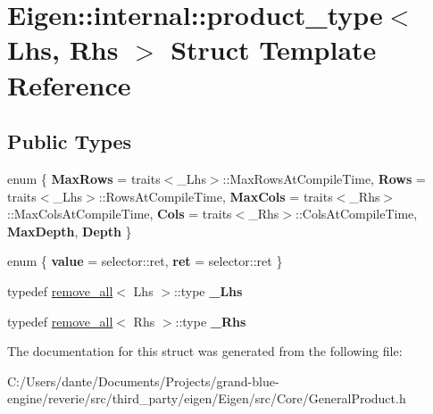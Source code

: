 \hypertarget{struct_eigen_1_1internal_1_1product__type}{}\section{Eigen\+::internal\+::product\+\_\+type$<$ Lhs, Rhs $>$ Struct Template Reference}
\label{struct_eigen_1_1internal_1_1product__type}
\subsection*{Public Types}
\begin{DoxyCompactItemize}
\item 
\mbox{\label{struct_eigen_1_1internal_1_1product__type_a43bedab2b6572dfa58b50adb88cfae9c}} 
enum \{ \newline
{\bfseries Max\+Rows} = traits$<$\+\_\+\+Lhs$>$\+::Max\+Rows\+At\+Compile\+Time, 
{\bfseries Rows} = traits$<$\+\_\+\+Lhs$>$\+::Rows\+At\+Compile\+Time, 
{\bfseries Max\+Cols} = traits$<$\+\_\+\+Rhs$>$\+::Max\+Cols\+At\+Compile\+Time, 
{\bfseries Cols} = traits$<$\+\_\+\+Rhs$>$\+::Cols\+At\+Compile\+Time, 
\newline
{\bfseries Max\+Depth}, 
{\bfseries Depth}
 \}
\item 
\mbox{\label{struct_eigen_1_1internal_1_1product__type_ab08e3c2381dfdaa6aff68d7395c0488f}} 
enum \{ {\bfseries value} = selector\+::ret, 
{\bfseries ret} = selector\+::ret
 \}
\item 
\mbox{\label{struct_eigen_1_1internal_1_1product__type_a7f952ac5559804440f762d4a23022851}} 
typedef \mbox{\hyperlink{struct_eigen_1_1internal_1_1remove__all}{remove\+\_\+all}}$<$ Lhs $>$\+::type {\bfseries \+\_\+\+Lhs}
\item 
\mbox{\label{struct_eigen_1_1internal_1_1product__type_a9c54100f6497ba2a60be9779c5dda2c2}} 
typedef \mbox{\hyperlink{struct_eigen_1_1internal_1_1remove__all}{remove\+\_\+all}}$<$ Rhs $>$\+::type {\bfseries \+\_\+\+Rhs}
\end{DoxyCompactItemize}


The documentation for this struct was generated from the following file\+:\begin{DoxyCompactItemize}
\item 
C\+:/\+Users/dante/\+Documents/\+Projects/grand-\/blue-\/engine/reverie/src/third\+\_\+party/eigen/\+Eigen/src/\+Core/General\+Product.\+h\end{DoxyCompactItemize}
